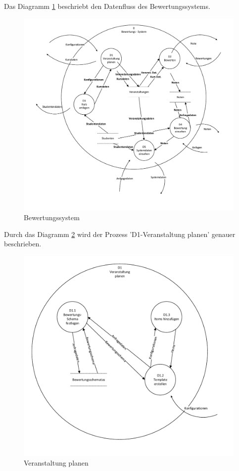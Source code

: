 \begin{appendix}
 \clearpage
 Das Diagramm \ref{fig:Diagramm0} beschriebt den Datenfluss des Bewertungssystems.
 
   \begin{figure}[H]
  \centering
  \includegraphics[width=\textwidth]{./img/dfd_diagramm0}
  \caption{Bewertungssystem}
  \label{fig:Diagramm0}
  \end{figure}
  \clearpage
  
  Durch das Diagramm \ref{fig:Diagramm1} wird der Prozess 'D1-Veranstaltung planen' genauer beschrieben.
   \begin{figure}[H]
   \centering
   \includegraphics[width=\textwidth]{./img/dfd_diagramm1}
   \caption{Veranstaltung planen}
   \label{fig:Diagramm1}
   \end{figure}
	\clearpage
	

\end{appendix}
